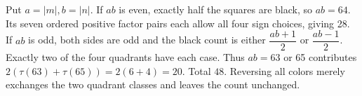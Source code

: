 Put $a=|m|,b=|n|$. If $ab$ is even, exactly half the squares are black, so $ab=64$. Its seven ordered positive factor pairs each allow all four sign choices, giving 28. If $ab$ is odd, both sides are odd and the black count is either $\dfrac{ab+1}{2}$ or $\dfrac{ab-1}{2}$. Exactly two of the four quadrants have each case. Thus $ab=63$ or 65 contributes $2(\tau(63)+\tau(65))=2(6+4)=20$. Total $\boxed{48}$. Reversing all colors merely exchanges the two quadrant classes and leaves the count unchanged.
